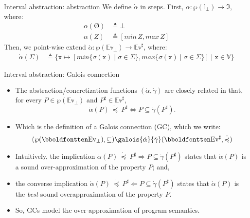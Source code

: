 \documentclass[aspectratio=169]{beamer}
\begin{document}
%
\begin{frame}{Interval abstraction: abstraction}
  We define $\dot{\alpha}$ in steps.
  First, $\alpha: \wp(\mathbb{I}_\bot) \to \pmb{\mathfrak{I}}$, where:
  \begin{align*}
    \alpha(\text{\O}) &\triangleq \bot\\
    \alpha(Z) &\triangleq [min\,Z,max\,Z]
  \end{align*}
  Then, we point-wise extend $\dot{\alpha} : \wp(\mathbb{Ev}_\bot) \to \mathbb{Ev}^\sharp$, where:
  \begin{align*}
    \dot{\alpha}(\Sigma) &\triangleq \{
                           \texttt{x} \mapsto [
                           min\{\sigma(\texttt{x})\;\pmb{|}\;\sigma \in \Sigma\},
                           max\{\sigma(\texttt{x})\;\pmb{|}\;\sigma \in \Sigma\}
                           ]\;\pmb{|}\; \texttt{x} \in \mathbb{V} \}
  \end{align*}
\end{frame}
%
\begin{frame}{Interval abstraction: Galois connection}
  \begin{itemize}
  \item The abstraction/concretization functions
    $(\dot{\alpha},\dot{\gamma})$ are closely related in that, for every
    $P \in \wp(\mathbb{Ev}_\bot)$ and $P^\sharp \in \mathbb{Ev}^\sharp$,
    \[
      \dot{\alpha}(P)\:\dot{\preccurlyeq}\: P^\sharp \Leftrightarrow P
      \subseteq \dot{\gamma}(P^\sharp).
    \]
  \pause\item Which is the definition of a Galois connection (GC), which we write:
    \[
      (\wp(\mathbb{Ev}_\bot),\subseteq)
      \galois{\dot{\alpha}}{\dot{\gamma}}
      (\mathbb{Ev}^\sharp,\dot{\preccurlyeq})
    \]
  \pause\item Intuitively, the implication $\dot{\alpha}(P)\:\dot{\preccurlyeq}\:P^\sharp \Rightarrow P
    \subseteq \dot{\gamma}(P^\sharp)$ states that $\dot{\alpha}(P)$ is a sound over-approximation
    of the property $P$; and,
  \pause\item the converse implication
    $\dot{\alpha}(P)\:\dot{\preccurlyeq}\:P^\sharp \Leftarrow P
    \subseteq \dot{\gamma}(P^\sharp)$ states that $\dot{\alpha}(P)$ is the
    \emph{best} sound overapproximation of the property $P$.
  \pause\item So, GCs model the over-approximation of program semantics.
  \end{itemize}
\end{frame}
\end{document}
